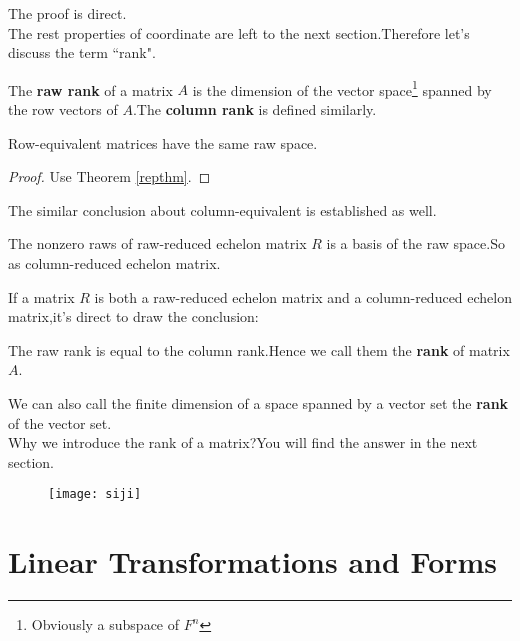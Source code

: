 \documentclass{article}
\begin{document}
The proof is direct.\\
\indent The rest properties of coordinate are left to the next section.Therefore let's discuss the term ``rank".
\begin{dde}
	The \textbf{raw rank} of a matrix $A$ is the dimension of the vector space\footnote{Obviously a subspace of $F^n$} spanned by the row vectors of $A$.The \textbf{column rank} is defined similarly.
\end{dde}
\begin{thm}
	Row-equivalent matrices have the same raw space. 
\end{thm}
\begin{proof}
	Use Theorem \ref{repthm}.
\end{proof}
The similar conclusion about column-equivalent is established as well.
\begin{thm}
	The nonzero raws of raw-reduced echelon matrix $R$ is a basis of the raw space.So as column-reduced echelon matrix.
\end{thm}
If a matrix $R$ is both a raw-reduced echelon matrix and a column-reduced echelon matrix,it's direct to draw the conclusion:
\begin{thm}
	The raw rank is equal to the column rank.Hence we call them the \textbf{rank} of matrix $A$.
\end{thm}
We can also call the finite dimension of a space spanned by a vector set the \textbf{rank} of the vector set.\\
\indent Why we introduce the rank of a matrix?You will find the answer in the next section.
\begin{figure}[htbp]
	\centering
	\texttt{[image: siji]}
\end{figure}
\newpage
\section{Linear Transformations and Forms}
\end{document}
